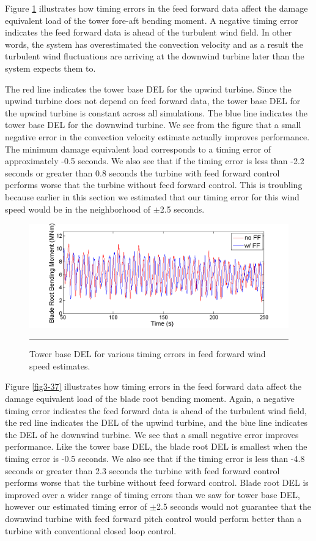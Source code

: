 Figure \ref{fig3-36} illustrates how timing errors in the feed forward data affect the damage equivalent load of the tower fore-aft bending moment. A negative timing error indicates the feed forward data is ahead of the turbulent wind field. In other words, the system has overestimated the convection velocity and as a result the turbulent wind fluctuations are arriving at the downwind turbine later than the system expects them to. 

The red line indicates the tower base DEL for the upwind turbine. Since the upwind turbine does not depend on feed forward data, the tower base DEL for the upwind turbine is constant across all simulations. The blue line indicates the tower base DEL for the downwind turbine. We see from the figure that a small negative error in the convection velocity estimate actually improves performance. The minimum damage equivalent load corresponds to a timing error of approximately -0.5 seconds. We also see that if the timing error is less than -2.2 seconds or greater than 0.8 seconds the turbine with feed forward control performs worse that the turbine without feed forward control. This is troubling because earlier in this section we estimated that our timing error for this wind speed would be in the neighborhood of $\pm$2.5 seconds.

\begin{figure}[htbp]
	\centering
		\includegraphics[trim = {1cm 0 2cm 0}, clip, width = \linewidth]{Figures/ch3Figures/fig3-35.png}
		\rule{35em}{0.5pt}
	\caption{Tower base DEL for various timing errors in feed forward wind speed estimates.}
	\label{fig3-36}
\end{figure}

Figure \ref{fig3-37} illustrates how timing errors in the feed forward data affect the damage equivalent load of the blade root bending moment. Again, a negative timing error indicates the feed forward data is ahead of the turbulent wind field, the red line indicates the DEL of the upwind turbine, and the blue line indicates the DEL of he downwind turbine. We see that a small negative error improves performance. Like the tower base DEL, the blade root DEL is smallest when the timing error is -0.5 seconds. We also see that if the timing error is less than -4.8 seconds or greater than 2.3 seconds the turbine with feed forward control performs worse that the turbine without feed forward control. Blade root DEL is improved over a wider range of timing errors than we saw for tower base DEL, however our estimated timing error of $\pm$2.5 seconds would not guarantee that the downwind turbine with feed forward pitch control would perform better than a turbine with conventional closed loop control.


